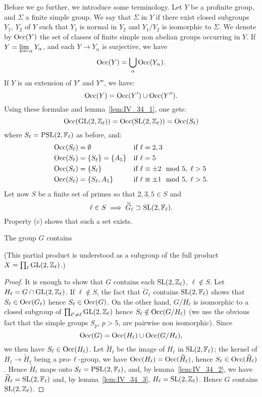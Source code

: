 Before we go further, we introduce some terminology. Let $Y$ be a profinite
group, and $\Sigma$ a finite simple group. We say that $\Sigma$ 
in $Y$ if there exist closed subgroups $Y_1$, $Y_2$ of $Y$ such that $Y_1$ is
normal in $Y_2$ and $Y_1/Y_2$ is isomorphic to $\Sigma$. We denote by
$\operatorname{Occ}(Y)$ the set of classes of finite simple non abelian groups
occurring in $Y$. If $Y = \varprojlim_\alpha Y_\alpha$, and each $Y \to Y_\alpha$
is surjective, we have
\[
	\operatorname{Occ}(Y) = \bigcup_{\alpha} \operatorname{Occ}(Y_\alpha).
\]
If $Y$ is an extension of $Y'$ and $Y''$, we have:
\[
	\operatorname{Occ}(Y) = \operatorname{Occ}(Y')\cup \operatorname{Occ}(Y'').
\]
Using these formulae and lemma~\ref{lem:IV_34_1}, one gets:
\[
	\operatorname{Occ}(\operatorname{GL}(2, \mathbb{Z}_\ell)) = \operatorname{Occ}(\operatorname{SL}(2, \mathbb{Z}_\ell)) = \operatorname{Occ}(S_\ell)
\]
where $S_\ell = \operatorname{PSL}(2, \mathbb{F}_\ell)$ as before, and:
\begin{align*}
	\operatorname{Occ}(S_\ell) &= \emptyset                && \text{if } \ell = 2,3 \\
	\operatorname{Occ}(S_\ell) &= \{ S_\ell \} = \{ A_5 \} && \text{if } \ell = 5 \\
	\operatorname{Occ}(S_\ell) &= \{ S_\ell \}             && \text{if } \ell \equiv \pm 2 \mod 5, \; \ell > 5 \\
	\operatorname{Occ}(S_\ell) &= \{ S_\ell, A_5 \}        && \text{if } \ell \equiv \pm 1 \mod 5, \; \ell > 5.
\end{align*}
Let now $S$ be a finite set of primes so that $2, 3, 5 \in S$ and
\dpage
\[
	\ell \in S \implies \widetilde{G}_\ell \supset \operatorname{SL}(2, \mathbb{F}_\ell).
\]
Property (c) shows that such a set exists.

\begin{lem}\label{lem:IV_34_5}
	The group $G$ contains 
\end{lem}
(This partial product is understood as a subgroup of the full product $X =
\prod_\ell \operatorname{GL}(2,\mathbb{Z}_\ell)$.)
\begin{proof}
	It is enough to show that $G$ contains each $\operatorname{SL}(2, \mathbb{Z}_\ell)$, $\ell
	\notin S$.
	Let $H_\ell = G \cap \operatorname{GL}(2, \mathbb{Z}_\ell)$. %
	If $\ell \notin S$, the fact that $\widetilde{G}_\ell$ contains $\operatorname{SL}(2,
	\mathbb{F}_\ell)$ shows that $S_\ell \in \operatorname{Occ}(G_\ell)$ hence $S_\ell \in
	\operatorname{Occ}(G)$. On the other hand, $G/H_\ell$ is isomorphic to a closed
	subgroup of $\prod_{\ell'\ne\ell} \operatorname{GL}(2, \mathbb{Z}_\ell)$ hence $S_\ell \notin
	\operatorname{Occ}(G/H_\ell)$ (we use the obvious fact that the simple groups $S_p$,
	$p > 5$, are pairwise non isomorphic). Since
	\[
		\operatorname{Occ}(G) = \operatorname{Occ}(H_\ell) \cup \operatorname{Occ}(G/H_\ell),
	\]
	we then have $S_\ell \in \operatorname{Occ}(H_\ell)$. Let $\widetilde{H}_\ell$ be the
	image of $H_\ell$ in $\operatorname{SL}(2, \mathbb{F}_\ell)$; the kernel of $H_\ell \to
	\widetilde{H}_\ell$ being a pro-$\ell$-group, we have $\operatorname{Occ}(H_\ell) =
	\operatorname{Occ}(\widetilde H_\ell)$, hence $S_\ell \in \operatorname{Occ}(\widetilde H_\ell)$.
	Hence $\widetilde H_\ell$ maps onto $S_\ell = \operatorname{PSL}(2,\mathbb{F}_\ell)$, and, by
	lemma~\ref{lem:IV_34_2}, we have $\widetilde H_\ell = \operatorname{SL}(2, \mathbb{F}_\ell)$
	and, by lemma~\ref{lem:IV_34_3}, $H_\ell = \operatorname{SL}(2, \mathbb{Z}_\ell)$. Hence $G$
	contains $\operatorname{SL}(2, \mathbb{Z}_\ell)$.
\end{proof}


